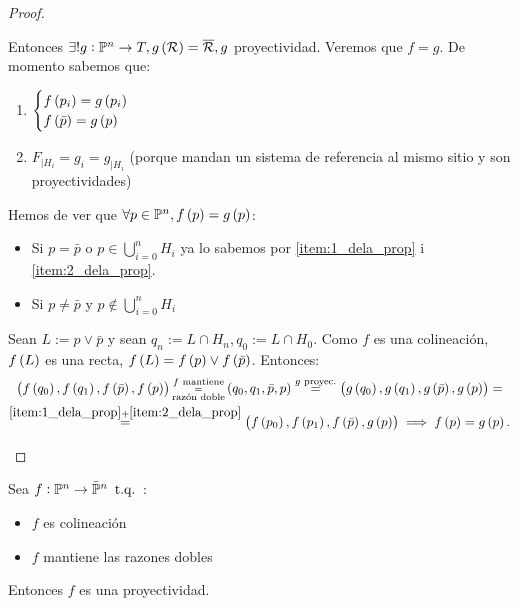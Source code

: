 \begin{proof}
\begin{itemize}
		Entonces $\exists! g : \mathbb{P}^n \to T, g \left( \mathcal{R} \right) = \overline{\mathcal{R}}, g$ proyectividad. Veremos que $f = g$.
		De momento sabemos que:
		\begin{enumerate}[(1)]
			\item\label{item:1_dela_prop} $\begin{cases} f \left( p_i \right) = g \left( p_i \right) \\ f \left( \bar{p} \right) = g \left( p \right) \end{cases}$
			\item\label{item:2_dela_prop} $F_{|H_i} = g_i = g_{|H_i}$ (porque mandan un sistema de referencia al mismo sitio y son proyectividades)
		\end{enumerate}
		Hemos de ver que $\forall p \in \mathbb{P}^n, f \left( p \right) = g \left( p \right)$:
		\begin{itemize}
			\item Si $p = \bar{p}$ o $p \in \bigcup_{i=0}^n H_i$ ya lo sabemos por \eqref{item:1_dela_prop} i \eqref{item:2_dela_prop}.
			\item Si $p \neq \bar{p}$ y $p \notin \bigcup_{i=0}^n H_i$
		\end{itemize}
		Sean $L := p \vee \bar{p}$ y sean $q_n := L \cap H_n, q_0 := L \cap H_0$. Como $f$ es una colineación, $f \left( L \right)$ es una recta, $f \left( L \right) = f \left( p \right) \vee f \left( \bar{p} \right)$.
		Entonces:
		\begin{gather*}
			\left( f \left( q_0 \right), f \left( q_1 \right), f \left( \bar{p} \right), f \left( p \right) \right) \substack{f \text{ mantiene} \\ = \\ \text{razón doble}} \left( q_0, q_1, \bar{p}, p \right) \stackrel{g \text{ proyec.}}{=} \left( g \left( q_0 \right), g \left( q_1 \right), g \left( \bar{p} \right), g \left( p \right) \right) = \\
			\stackrel{\eqref{item:1_dela_prop} + \eqref{item:2_dela_prop}}{=} \left( f \left( p_0 \right), f \left( p_1 \right), f \left( \bar{p} \right), g \left( p \right) \right) \implies f \left( p \right) = g \left( p \right).
		\end{gather*}
	\end{itemize}
\end{proof}
\begin{teo} \label{teo:proyectividades}
	Sea $f : \mathbb{P}^n \to \bar{\mathbb{P}}^n \operatorname{\text{ t.q. }}$:
	\begin{itemize}
		\item $f$ es colineación
		\item $f$ mantiene las razones dobles
	\end{itemize}
	Entonces $f$ es una proyectividad.
\end{teo}
